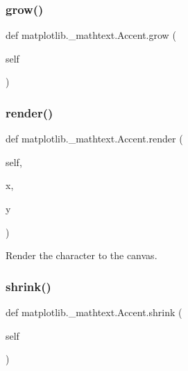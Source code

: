 \subsubsection{\texorpdfstring{grow()}{grow()}}
{\footnotesize\ttfamily def matplotlib.\+\_\+mathtext.\+Accent.\+grow (\begin{DoxyParamCaption}\item[{}]{self }\end{DoxyParamCaption})}

\mbox{\label{classmatplotlib_1_1__mathtext_1_1Accent_a733af2b32fa82b888aaab0f4b784705e}} 
\subsubsection{\texorpdfstring{render()}{render()}}
{\footnotesize\ttfamily def matplotlib.\+\_\+mathtext.\+Accent.\+render (\begin{DoxyParamCaption}\item[{}]{self,  }\item[{}]{x,  }\item[{}]{y }\end{DoxyParamCaption})}

\begin{DoxyVerb}Render the character to the canvas.
\end{DoxyVerb}
 \mbox{\label{classmatplotlib_1_1__mathtext_1_1Accent_a1b741359011425ebdd793ca352af7c81}} 
\subsubsection{\texorpdfstring{shrink()}{shrink()}}
{\footnotesize\ttfamily def matplotlib.\+\_\+mathtext.\+Accent.\+shrink (\begin{DoxyParamCaption}\item[{}]{self }\end{DoxyParamCaption})}



